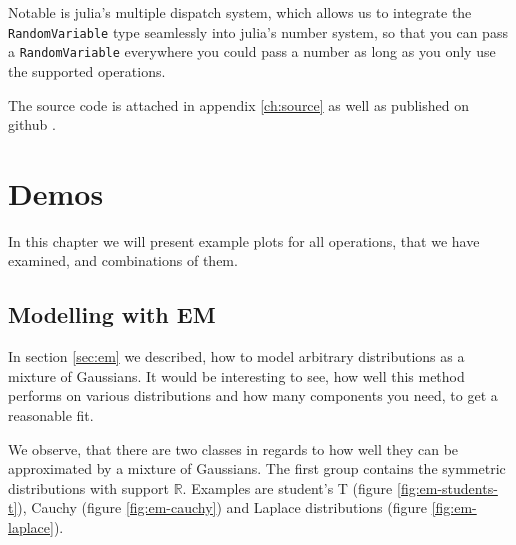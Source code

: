 \documentclass[11pt,a4paper]{book}
\newcommand{\injulia}[1]{\texttt{#1}}
\begin{document}
Notable is julia's multiple dispatch system, which allows us to integrate the
\injulia{RandomVariable} type seamlessly into julia's number system, so that you
can pass a \injulia{RandomVariable} everywhere you could pass a number as long
as you only use the supported operations.

The source code is attached in appendix \ref{ch:source} as well as published on
github \cite{github}.

\chapter{Demos}
\label{ch:comparisons}

In this chapter we will present example plots for all operations, that we have
examined, and combinations of them.

\section{Modelling with EM}

In section \ref{sec:em} we described, how to model arbitrary distributions as a
mixture of Gaussians. It would be interesting to see, how well this method
performs on various distributions and how many components you need, to get a
reasonable fit.

We observe, that there are two classes in regards to how well they can be
approximated by a mixture of Gaussians. The first group contains the symmetric
distributions with support $\mathbb{R}$. Examples are student's T (figure
\ref{fig:em-students-t}), Cauchy (figure \ref{fig:em-cauchy}) and Laplace
distributions (figure \ref{fig:em-laplace}).
\end{document}
